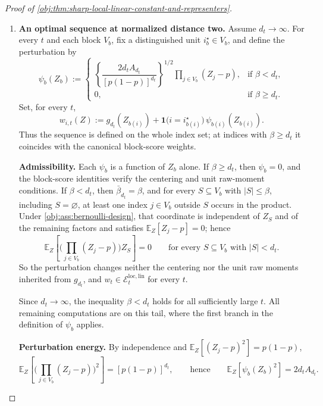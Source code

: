 \documentclass[11pt]{article}
\begin{document}
\begin{proof}[Proof of \cref{obj:thm:sharp-local-linear-constant-and-representers}]
\begin{enumerate}
\item \textbf{An optimal sequence at normalized distance two.}  Assume \(d_t\to\infty\).  For every \(t\) and each block \(V_b\), fix a distinguished unit \(i_b^\star\in V_b\), and define the perturbation by
\[
\psi_b(Z_b)
:=
\begin{cases}
\left\{\dfrac{2d_tA_{d_t}}{[p(1-p)]^{d_t}}\right\}^{1/2}
\prod_{j\in V_b}(Z_j-p), & \text{if }\beta<d_t,\\[1ex]
0, & \text{if }\beta\ge d_t.
\end{cases}
\]
Set, for every \(t\),
\[
w_{i,t}(Z)
:=
g_{d_t}(Z_{b(i)})
+
\mathbf 1\bigl(i=i^\star_{b(i)}\bigr)\,\psi_{b(i)}(Z_{b(i)}).
\]
Thus the sequence is defined on the whole index set; at indices with \(\beta\ge d_t\) it coincides with the canonical block-score weights. %

\textbf{Admissibility.}  Each \(\psi_b\) is a function of \(Z_b\) alone.  If \(\beta\ge d_t\), then \(\psi_b=0\), and the block-score identities verify the centering and unit raw-moment conditions.  If \(\beta<d_t\), then \(\bar\beta_{d_t}=\beta\), and for every \(S\subseteq V_b\) with \(|S|\le\beta\), including \(S=\varnothing\), at least one index \(j\in V_b\) outside \(S\) occurs in the product.  Under \cref{obj:ass:bernoulli-design}, that coordinate is independent of \(Z_S\) and of the remaining factors and satisfies \(\mathbb E_Z[Z_j-p]=0\); hence
\[
\mathbb E_Z\!\left[\bigl(\prod_{j\in V_b}(Z_j-p)\bigr)Z_S\right]=0
\qquad\text{for every }S\subseteq V_b\text{ with }|S|<d_t .
\]
So the perturbation changes neither the centering nor the unit raw moments inherited from \(g_{d_t}\), and \(w_t\in\mathcal E_t^{\mathrm{loc,lin}}\) for every \(t\).

Since \(d_t\to\infty\), the inequality \(\beta<d_t\) holds for all sufficiently large \(t\).  All remaining computations are on this tail, where the first branch in the definition of \(\psi_b\) applies.

\textbf{Perturbation energy.}  By independence and \(\mathbb E_Z[(Z_j-p)^2]=p(1-p)\),
\[
\mathbb E_Z\!\left[\bigl(\prod_{j\in V_b}(Z_j-p)\bigr)^2\right]=[p(1-p)]^{d_t},
\qquad\text{hence}\qquad
\mathbb E_Z\!\left[\psi_b(Z_b)^2\right]=2d_tA_{d_t}.
\]


\end{enumerate}
\end{proof}
\end{document}
